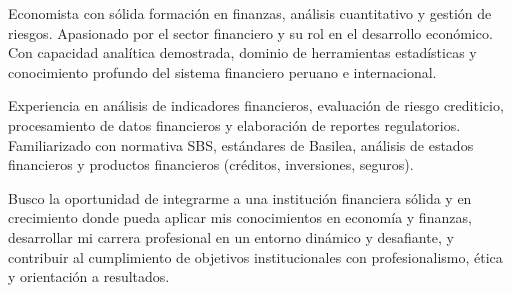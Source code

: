 \par{
	
	Economista con sólida formación en finanzas, análisis cuantitativo y gestión de riesgos. Apasionado por el sector financiero y su rol en el desarrollo económico. Con capacidad analítica demostrada, dominio de herramientas estadísticas y conocimiento profundo del sistema financiero peruano e internacional.
	
	Experiencia en análisis de indicadores financieros, evaluación de riesgo crediticio, procesamiento de datos financieros y elaboración de reportes regulatorios. Familiarizado con normativa SBS, estándares de Basilea, análisis de estados financieros y productos financieros (créditos, inversiones, seguros).
	
	Busco la oportunidad de integrarme a una institución financiera sólida y en crecimiento donde pueda aplicar mis conocimientos en economía y finanzas, desarrollar mi carrera profesional en un entorno dinámico y desafiante, y contribuir al cumplimiento de objetivos institucionales con profesionalismo, ética y orientación a resultados.

	
	

	
}

